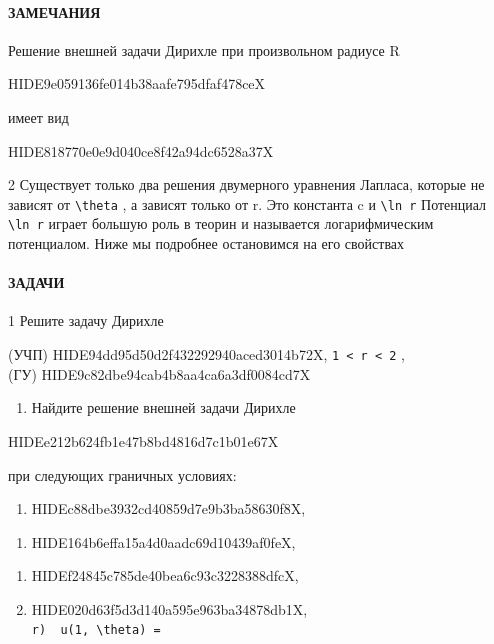 \documentclass[
  ukrainian,
]{article}
\providecommand{\tightlist}{%
  \setlength{\itemsep}{0pt}\setlength{\parskip}{0pt}}
\begin{document}
\paragraph{ЗАМЕЧАНИЯ}\label{ux437ux430ux43cux435ux447ux430ux43dux438ux44f}

Решение внешней задачи Дирихле при произвольном радиусе R

HIDE9e059136fe014b38aafe795dfaf478ceX

имеет вид

HIDE818770e0e9d040ce8f42a94dc6528a37X

2 Существует только два решения двумерного уравнения Лапласа, которые не
зависят от \texttt{\textbackslash{}theta} , а зависят только от r. Это
константа c и \texttt{\textbackslash{}ln\ r} Потенциал
\texttt{\textbackslash{}ln\ r} играет большую роль в теорин и называется
логарифмическим потенциалом. Ниже мы подробнее остановимся на его
свойствах

\paragraph{ЗАДАЧИ}\label{ux437ux430ux434ux430ux447ux438}

1 Решите задачу Дирихле

(УЧП) HIDE94dd95d50d2f432292940aced3014b72X,
\texttt{1\ \textless{}\ r\ \textless{}\ 2} ,\\
(ГУ) HIDE9c82dbe94cab4b8aa4ca6a3df0084cd7X

\begin{enumerate}
\def\labelenumi{\arabic{enumi}.}
\setcounter{enumi}{1}
\tightlist
\item
  Найдите решение внешней задачи Дирихле
\end{enumerate}

HIDEe212b624fb1e47b8bd4816d7c1b01e67X

при следующих граничных условиях:

\begin{enumerate}
\def\labelenumi{\alph{enumi})}
\tightlist
\item
  HIDEc88dbe3932cd40859d7e9b3ba58630f8X,
\end{enumerate}

\begin{enumerate}
\def\labelenumi{\arabic{enumi})}
\setcounter{enumi}{5}
\tightlist
\item
  HIDE164b6effa15a4d0aadc69d10439af0feX,
\end{enumerate}

\begin{enumerate}
\def\labelenumi{\Alph{enumi})}
\setcounter{enumi}{1}
\item
  HIDEf24845c785de40bea6c93c3228388dfcX,
\item
  HIDE020d63f5d3d140a595e963ba34878db1X,\\
  \texttt{r)\ \ u(1,\ \textbackslash{}theta)\ =}
\end{enumerate}
\end{document}
